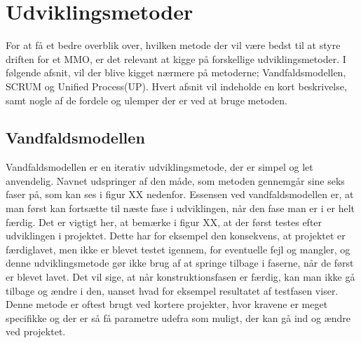 \cfoot{\page\textbackslash \totalp} %
\setcounter{page}{1}
\chapter{Udviklingsmetoder}
For at få et bedre overblik over, hvilken metode der vil være bedst til at styre driften for et MMO, er det relevant at kigge på forskellige udviklingsmetoder. I følgende afsnit, vil der blive kigget nærmere på metoderne; Vandfaldsmodellen, SCRUM og Unified Process(UP). Hvert afsnit vil indeholde en kort beskrivelse, samt nogle af de fordele og ulemper der er ved at bruge metoden.

\section{Vandfaldsmodellen} \cite{Waterfall}
Vandfaldsmodellen er en iterativ udviklingsmetode, der er simpel og let anvendelig. Navnet udspringer af den måde, som metoden gennemgår sine seks faser på, som kan ses i figur XX nedenfor. Essensen ved vandfaldsmodellen er, at man først kan fortsætte til næste fase i udviklingen, når den fase man er i er helt færdig. Det er vigtigt her, at bemærke i figur XX, at der først testes efter udviklingen i projektet. Dette har for eksempel den konsekvens, at projektet er færdiglavet, men ikke er blevet testet igennem, for eventuelle fejl og mangler, og denne udviklingsmetode gør ikke brug af at springe tilbage i faserne, når de først er blevet lavet. Det vil sige, at når konstruktionsfasen er færdig, kan man ikke gå tilbage og ændre i den, uanset hvad for eksempel resultatet af testfasen viser. Denne metode er oftest brugt ved kortere projekter, hvor kravene er meget specifikke og der er så få parametre udefra som muligt, der kan gå ind og ændre ved projektet.



